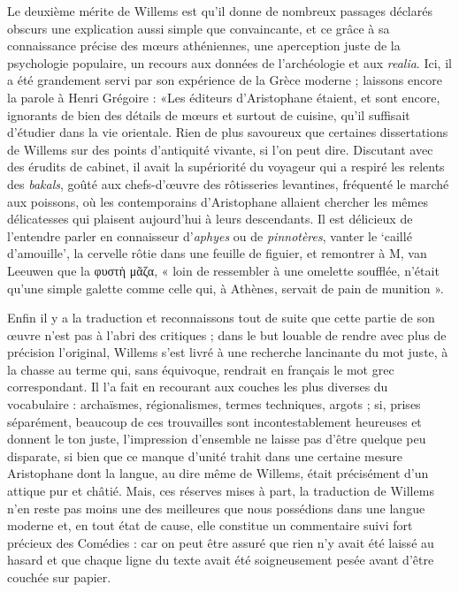 \documentclass{book}%
\newcommand{\italique}[1]{\textit{#1}}%
\begin{document}
Le deuxième mérite de Willems est qu'il donne de nombreux passages déclarés obscurs une explication aussi simple que convaincante, et ce grâce à sa connaissance précise des mœurs athéniennes, une aperception juste de la psychologie populaire, un recours aux données de l'archéologie et aux \italique{realia}. Ici, il a été grandement servi par son expérience de la Grèce moderne ; laissons encore la parole à Henri Grégoire :  «Les éditeurs d'Aristophane étaient, et sont encore, ignorants de bien des détails de mœurs et surtout de cuisine, qu'il suffisait d'étudier dans la vie orientale. Rien de plus savoureux que certaines dissertations de Willems sur des points d'antiquité vivante, si l'on peut dire. Discutant avec des érudits de cabinet, il avait la supériorité du voyageur qui a respiré les relents des \italique{bakals}, goûté aux chefs-d'œuvre des rôtisseries levantines, fréquenté le marché aux poissons, où les contemporains d'Aristophane allaient chercher les mêmes délicatesses qui plaisent aujourd'hui à leurs descendants.
Il est délicieux de l'entendre parler en connaisseur d'\italique{aphyes} ou de \italique{pinnotères}, vanter le `caillé d'amouille', la cervelle rôtie dans une feuille de figuier, et remontrer à M, van Leeuwen que la φυστὴ μᾶζα, « loin de ressembler à une omelette soufflée, n'était qu'une simple galette comme celle qui, à Athènes, servait de pain de munition ». 

Enfin il y a la traduction et reconnaissons tout de suite que cette partie de son œuvre n'est pas à l'abri des critiques ; dans le but louable de rendre avec plus de précision l'original, Willems s'est livré à une recherche lancinante du mot juste, à la chasse au terme qui, sans équivoque, rendrait en français le mot grec correspondant. 
Il l'a fait en recourant aux couches les plus diverses du vocabulaire : archaïsmes, régionalismes, termes techniques, argots ; si, prises séparément, beaucoup de ces trouvailles sont incontestablement heureuses et donnent le ton juste, l'impression d'ensemble ne laisse pas d'être quelque peu disparate, si bien que ce manque d'unité trahit dans une certaine mesure Aristophane dont la langue, au dire même de Willems, était précisément d'un attique pur et châtié.
Mais, ces réserves mises à part, la traduction de Willems n'en reste pas moins une des meilleures que nous possédions dans une langue moderne et, en tout état de cause, elle constitue un commentaire suivi fort précieux des Comédies : car on peut être assuré que rien n'y avait été laissé au hasard et que chaque ligne du texte avait été soigneusement pesée avant d'être couchée sur papier.\\
\end{document}
